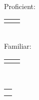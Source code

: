 {		\noindent\begin{minipage}{\linewidth}
		\majorsection{\projects} 
		\projectParasite 
		\projectPytext 
		\end{minipage}
		

	}{ %
	
		
		\noindent\begin{minipage}[t]{0.275\textwidth}
			
			\sidesection{\educationhistory}	\\[0.25\baselineskip]
			\educationUW 
			\educationToudai
			\educationEvergreen
			\educationHyogo
			
			\sidesection{\courses} \\
			\sidebarcoursework
			
			
			\sidesection{\skills} \\ 
			Proficient:\\[0.25\baselineskip]
			\begin{tabular}{l l}
				\proficientskills
			\end{tabular}\\
			Familiar: \\[0.25\baselineskip]
			\begin{tabular}{l l} 
				\familiarskills
			\end{tabular}

			
			\sidesection{\skillslanguage} \\
			\begin{tabular}{l}
				\skillenglish \\
				\skilljapanese
			\end{tabular} \quarterlinebreak \\
			
			
		\end{minipage}
		\hfill
		\begin{minipage}[t]{0.7\textwidth}
			\majorsection{\experience} 
				\jobexpOctanoveIntern
				\jobexpNPD
				\jobexpGSP
				\jobexpGDIIntern	
		\majorsection{\graduatecoursework} 
		\courseworkML
		\courseworkNLM
		\courseworkNLP

		\majorsection{\projectsawards\vspace{-0.25\baselineskip}} 
		\awardAmplify 
		\awardGoldenTicket 
		\projectParasite
		
		\end{minipage}
		
	}
	
